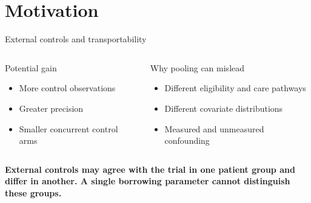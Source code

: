 \documentclass[11pt,aspectratio=169]{beamer}
\begin{document}
\section{Motivation}
\begin{frame}{External controls and transportability}
  \begin{columns}[T,onlytextwidth]
      \begin{block}{Potential gain}
        \begin{itemize}
          \item More control observations
          \item Greater precision
          \item Smaller concurrent control arms
        \end{itemize}
      \end{block}
      \begin{alertblock}{Why pooling can mislead}
        \begin{itemize}
          \item Different eligibility and care pathways
          \item Different covariate distributions
          \item Measured and unmeasured confounding
        \end{itemize}
      \end{alertblock}
  \end{columns}
  \vspace{0.5em}
  \centering
  \textbf{External controls may agree with the trial in one patient group and differ in another. A single borrowing parameter cannot distinguish these groups.}
\end{frame}
\end{document}

